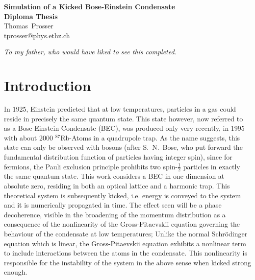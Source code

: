 \documentclass[12pt]{book}
\begin{document}

\begin{titlepage}
  \vspace{2.5cm}
  \begin{center}
    \vspace{3.5cm}
    {\huge {\bf  Simulation of a Kicked Bose-Einstein Condensate\\}}
    \vspace{1.5cm}
    {\large {\bf Diploma Thesis\\}}
    \vspace{1.5cm}
    {Thomas~Prosser\\
    tprosser@phys.ethz.ch}
  \end{center}
\end{titlepage}

\thispagestyle{empty}
	\newenvironment{dedication}
		{\cleardoublepage \thispagestyle{empty}\vspace*{\stretch{0.5}}\begin{center} \em}
		{\end{center} \vspace{\stretch{3}} \clearpage}
	\begin{dedication}
		To my father, who would have liked to see this completed.
	\end{dedication}
\thispagestyle{empty}

\mainmatter
\tableofcontents
\pagestyle{fancy}

\chapter*{Introduction}
In 1925, Einstein predicted that at low temperatures, particles in a gas could reside in precisely the same quantum state. 
This state however, now referred to as a Bose-Einstein Condensate (BEC),
was produced only very recently, in 1995~\cite{anderson} with about 2000 ${}^{87}$Rb-Atoms in a quadrupole trap.
As the name suggests, this state can only be observed with bosons (after S.~N.~Bose, who put forward the fundamental 
distribution function of particles having integer spin), since for fermions, the Pauli exclusion principle prohibits 
two spin-$\frac{1}{2}$ particles in exactly the same quantum state. This work considers a  BEC in one dimension at absolute zero, residing in both an optical lattice and a harmonic trap.
This theoretical system is subsequently kicked, i.e. energy is conveyed
to the system and it is numerically propagated in time. The effect seen will be a phase decoherence, visible in the broadening of the momentum distribution as a consequence
of the nonlinearity of the Gross-Pitaevskii equation governing the behaviour of the condensate at low temperatures; Unlike the normal Schr\"odinger equation which is linear, the Gross-Pitaevskii
equation exhibits a nonlinear term to include interactions between the atoms in the condensate. This nonlinearity is responsible for the instability of the system in the above sense when kicked strong enough.
\end{document}
